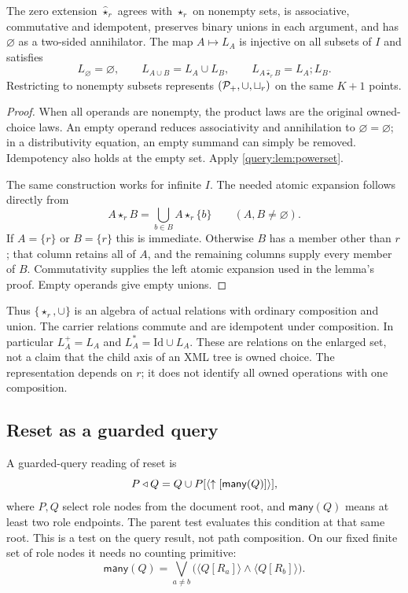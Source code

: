 \begin{proposition}\label{query:prop:relations}
The zero extension $\widehat\star_r$ agrees with $\star_r$ on nonempty
sets, is associative, commutative and idempotent, preserves binary
unions in each argument, and has $\varnothing$ as a two-sided
annihilator. The map $A\mapsto L_A$ is injective on all subsets of $I$
and satisfies
\[
 L_\varnothing=\varnothing,\qquad
 L_{A\cup B}=L_A\cup L_B,\qquad
 L_{A\mathbin{\widehat\star_r} B}=L_A;L_B.
\]
Restricting to nonempty subsets represents $(\mathcal P_+,\cup,\sqcup_r)$
on the same $K+1$ points.
\end{proposition}
\begin{proof}
When all operands are nonempty, the product laws are the original
owned-choice laws. An empty operand reduces associativity and
annihilation to $\varnothing=\varnothing$; in a distributivity equation,
an empty summand can simply be removed. Idempotency also holds at the
empty set. Apply \cref{query:lem:powerset}.

The same construction works for infinite $I$. The needed atomic
expansion follows directly from
\[
 A\star_r B=\bigcup_{b\in B}A\star_r\{b\}
 \qquad(A,B\ne\varnothing).
\]
If $A=\{r\}$ or $B=\{r\}$ this is immediate. Otherwise $B$ has a
member other than $r$; that column retains all of $A$, and the remaining
columns supply every member of $B$. Commutativity supplies the left
atomic expansion used in the lemma's proof. Empty operands give empty
unions.
\end{proof}

Thus $\{\star_r,\cup\}$ is an algebra of actual relations with ordinary
composition and union. The carrier relations commute and are idempotent
under composition. In particular $L_A^+=L_A$ and
$L_A^*=\mathrm{Id}\cup L_A$. These are relations on the enlarged set,
not a claim that the child axis of an XML tree is owned choice. The
representation depends on $r$; it does not identify all owned operations
with one composition.

\subsection{Reset as a guarded query}

A guarded-query reading of reset is
\[
 P\mathbin{\triangleleft} Q=Q\cup P[\langle\uparrow[\mathsf{many}(Q)]\rangle],
\]
where $P,Q$ select role nodes from the document root, and
$\mathsf{many}(Q)$ means at least two role endpoints. The parent test
evaluates this condition at that same root.
This is a test on the query result, not path composition. On our fixed
finite set of role nodes it needs no counting primitive:
\[
 \mathsf{many}(Q)=
 \bigvee_{a\ne b}
   \bigl(\langle Q[R_a]\rangle\land\langle Q[R_b]\rangle\bigr).
\]

